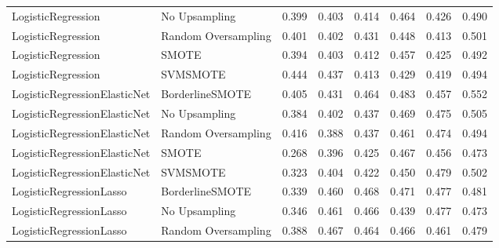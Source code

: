 \begin{tabular}{llllllll}
          LogisticRegression &       No Upsampling & 0.399 &                     0.403 &                 0.414 &                  0.464 &                                   0.426 &     0.490 \\
          LogisticRegression & Random Oversampling & 0.401 &                     0.402 &                 0.431 &                  0.448 &                                   0.413 &     0.501 \\
          LogisticRegression &               SMOTE & 0.394 &                     0.403 &                 0.412 &                  0.457 &                                   0.425 &     0.492 \\
          LogisticRegression &            SVMSMOTE & 0.444 &                     0.437 &                 0.413 &                  0.429 &                                   0.419 &     0.494 \\
LogisticRegressionElasticNet &     BorderlineSMOTE & 0.405 &                     0.431 &                 0.464 &                  0.483 &                                   0.457 &     0.552 \\
LogisticRegressionElasticNet &       No Upsampling & 0.384 &                     0.402 &                 0.437 &                  0.469 &                                   0.475 &     0.505 \\
LogisticRegressionElasticNet & Random Oversampling & 0.416 &                     0.388 &                 0.437 &                  0.461 &                                   0.474 &     0.494 \\
LogisticRegressionElasticNet &               SMOTE & 0.268 &                     0.396 &                 0.425 &                  0.467 &                                   0.456 &     0.473 \\
LogisticRegressionElasticNet &            SVMSMOTE & 0.323 &                     0.404 &                 0.422 &                  0.450 &                                   0.479 &     0.502 \\
     LogisticRegressionLasso &     BorderlineSMOTE & 0.339 &                     0.460 &                 0.468 &                  0.471 &                                   0.477 &     0.481 \\
     LogisticRegressionLasso &       No Upsampling & 0.346 &                     0.461 &                 0.466 &                  0.439 &                                   0.477 &     0.473 \\
     LogisticRegressionLasso & Random Oversampling & 0.388 &                     0.467 &                 0.464 &                  0.466 &                                   0.461 &     0.479 \\

\end{tabular}
